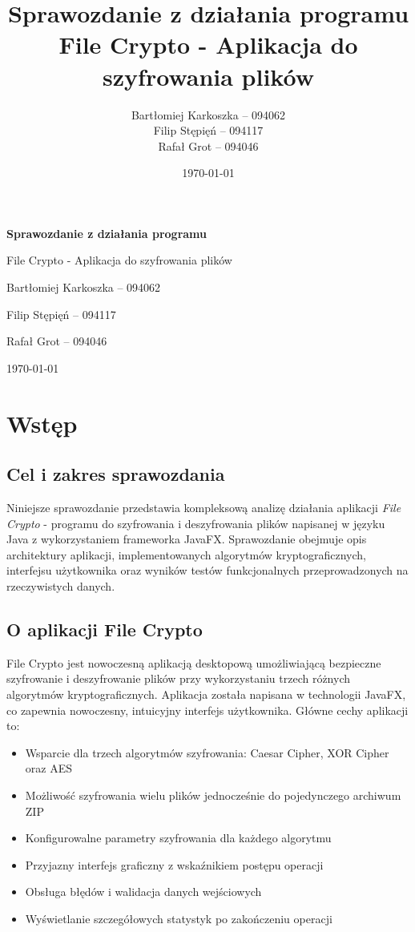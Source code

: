 \documentclass[12pt,a4paper]{article}
\title{Sprawozdanie z działania programu\\File Crypto - Aplikacja do szyfrowania plików}
\author{Bartłomiej Karkoszka -- 094062\\Filip Stępięń -- 094117\\Rafał Grot -- 094046}
\date{\today}
\begin{document}
\begin{titlepage}
\centering
\vspace*{\fill}
{\huge\bfseries Sprawozdanie z działania programu\par}
\vspace{0.5cm}
{\Large File Crypto - Aplikacja do szyfrowania plików\par}
\vspace{2cm}
{\large
Bartłomiej Karkoszka -- 094062\par
Filip Stępięń -- 094117\par
Rafał Grot -- 094046\par}
\vspace{2cm}
{\large \today\par}
\vspace*{\fill}
\end{titlepage}

\newpage
\tableofcontents
\newpage

\section{Wstęp}

\subsection{Cel i zakres sprawozdania}

Niniejsze sprawozdanie przedstawia kompleksową analizę działania aplikacji \textit{File Crypto} - programu do szyfrowania i deszyfrowania plików napisanej w języku Java z wykorzystaniem frameworka JavaFX. Sprawozdanie obejmuje opis architektury aplikacji, implementowanych algorytmów kryptograficznych, interfejsu użytkownika oraz wyników testów funkcjonalnych przeprowadzonych na rzeczywistych danych.

\subsection{O aplikacji File Crypto}

File Crypto jest nowoczesną aplikacją desktopową umożliwiającą bezpieczne szyfrowanie i deszyfrowanie plików przy wykorzystaniu trzech różnych algorytmów kryptograficznych. Aplikacja została napisana w technologii JavaFX, co zapewnia nowoczesny, intuicyjny interfejs użytkownika. Główne cechy aplikacji to:

\begin{itemize}
\item Wsparcie dla trzech algorytmów szyfrowania: Caesar Cipher, XOR Cipher oraz AES
\item Możliwość szyfrowania wielu plików jednocześnie do pojedynczego archiwum ZIP
\item Konfigurowalne parametry szyfrowania dla każdego algorytmu
\item Przyjazny interfejs graficzny z wskaźnikiem postępu operacji
\item Obsługa błędów i walidacja danych wejściowych
\item Wyświetlanie szczegółowych statystyk po zakończeniu operacji
\end{itemize}
\end{document}
